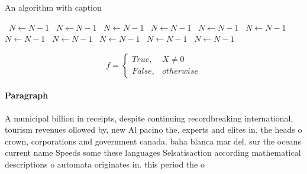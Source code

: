 \documentclass[a4paper]{article}
\begin{document}
\begin{algorithm}
\caption{An algorithm with caption}
\begin{algorithmic}
\    \State $N \gets N - 1$
\    \State $N \gets N - 1$
\    \State $N \gets N - 1$
\    \State $N \gets N - 1$
\    \State $N \gets N - 1$
\    \State $N \gets N - 1$
\    \State $N \gets N - 1$
\    \State $N \gets N - 1$
\    \State $N \gets N - 1$
\    \State $N \gets N - 1$
\    \State $N \gets N - 1$
\EndWhile
\end{algorithmic}
\end{algorithm}

\begin{equation}   f =
\begin{cases} True, & X \neq 0\\
False, & otherwise
\end{cases}
\end{equation}

\paragraph{Paragraph}
A municipal billion in receipts, despite continuing recordbreaking international, tourism revenues ollowed by, new Al pacino the, experts and elites in, the heads o crown, corporations and government canada. baha blanca mar del. sur the oceans current name Speeds some these languages Selsatisaction according mathematical descriptions o automata originates in. this period the o
\end{document}
